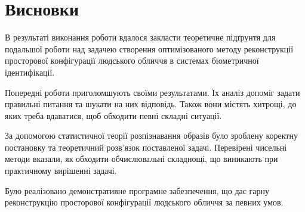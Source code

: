 \chapter*{Висновки}

В результаті виконання роботи вдалося
закласти теоретичне підґрунтя для подальшої роботи над задачею
створення оптимізованого методу реконструкції просторової конфігурації
людського обличчя в системах біометричної ідентифікації.

Попередні роботи приголомшують своїми результатами.
Їх аналіз допоміг задати правильні питання та шукати на них відповідь.
Також вони містять хитрощі, до яких треба вдаватися,
щоб обходити певні складні ситуації.

За допомогою статистичної теорії розпізнавання образів
було зроблену коректну постановку та теоретичний розв'язок поставленої задачі.
Перевірені чисельні методи вказали,
як обходити обчислювальні складнощі,
що виникають при практичному вирішенні задачі.

Було реалізовано демонстративне програмне забезпечення,
що дає гарну реконструкцію просторової конфігурації
людського обличчя за певних умов.
